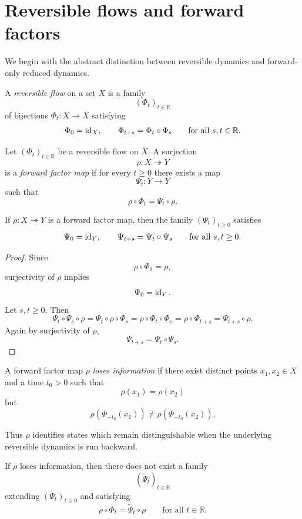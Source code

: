 \section{Reversible flows and forward factors}
We begin with the abstract distinction between reversible dynamics and
forward-only reduced dynamics.
\begin{definition}
	A \emph{reversible flow} on a set \(X\) is a family
	\[
		(\Phi_t)_{t\in\mathbb R}
	\]
	of bijections \(\Phi_t\colon X\to X\) satisfying
	\[
		\Phi_0=\operatorname{id}_X,
		\qquad
		\Phi_{t+s}=\Phi_t\circ\Phi_s
		\qquad
		\text{for all }s,t\in\mathbb R.
	\]
\end{definition}
\begin{definition}
	Let \((\Phi_t)_{t\in\mathbb R}\) be a reversible flow on \(X\).
	A surjection
	\[
		\rho\colon X\twoheadrightarrow Y
	\]
	is a \emph{forward factor map} if for every \(t\ge0\) there exists a map
	\[
		\Psi_t\colon Y\to Y
	\]
	such that
	\[
		\rho\circ\Phi_t=\Psi_t\circ\rho.
	\]
\end{definition}
\begin{lemma}
	If \(\rho\colon X\twoheadrightarrow Y\) is a forward factor map, then
	the family \((\Psi_t)_{t\ge0}\) satisfies
	\[
		\Psi_0=\operatorname{id}_Y,
		\qquad
		\Psi_{t+s}=\Psi_t\circ\Psi_s
		\qquad
		\text{for all }s,t\ge0.
	\]
\end{lemma}
\begin{proof}
	Since
	\[
		\rho\circ\Phi_0=\rho,
	\]
	surjectivity of \(\rho\) implies
	\[
		\Psi_0=\operatorname{id}_Y.
	\]
	Let \(s,t\ge0\). Then
	\[
		\Psi_t\circ\Psi_s\circ\rho
		=
		\Psi_t\circ\rho\circ\Phi_s
		=
		\rho\circ\Phi_t\circ\Phi_s
		=
		\rho\circ\Phi_{t+s}
		=
		\Psi_{t+s}\circ\rho.
	\]
	Again by surjectivity of \(\rho\),
	\[
		\Psi_{t+s}=\Psi_t\circ\Psi_s.
	\]
\end{proof}
\begin{definition}
	\label{def:flow-information-loss}
	A forward factor map \(\rho\) \emph{loses information} if there exist
	distinct points \(x_1,x_2\in X\) and a time \(t_0>0\) such that
	\[
		\rho(x_1)=\rho(x_2)
	\]
	but
	\[
		\rho(\Phi_{-t_0}(x_1))\neq \rho(\Phi_{-t_0}(x_2)).
	\]
\end{definition}
Thus \(\rho\) identifies states which remain distinguishable when the
underlying reversible dynamics is run backward.
\begin{lemma}
	\label{lem:flow-information-loss}
	If \(\rho\) loses information, then there does not exist a family
	\[
		(\widetilde\Psi_t)_{t\in\mathbb R}
	\]
	extending \((\Psi_t)_{t\ge0}\) and satisfying
	\[
		\rho\circ\Phi_t=\widetilde\Psi_t\circ\rho
		\qquad
		\text{for all }t\in\mathbb R.
	\]
\end{lemma}
